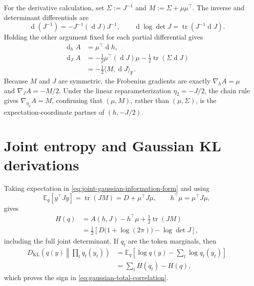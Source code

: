 For the derivative calculation, set $\Sigma:=J^{-1}$ and $M:=\Sigma+\mu\mu^\top$.  The inverse and determinant differentials are
\begin{equation}
\mathop{\mathrm d}(J^{-1})
=-J^{-1}(\mathop{\mathrm d}J)J^{-1},
\qquad
\mathop{\mathrm d}\log\det J
=\operatorname{tr}(J^{-1}\mathop{\mathrm d}J).
\label{eq:inverse-logdet-differentials}
\end{equation}
Holding the other argument fixed for each partial differential gives
\begin{equation}
\begin{aligned}
\mathop{\mathrm d}_hA
&=\mu^\top\mathop{\mathrm d}h,\\
\mathop{\mathrm d}_JA
&=-\frac12\mu^\top(\mathop{\mathrm d}J)\mu
-\frac12\operatorname{tr}(\Sigma\mathop{\mathrm d}J)\\
&=-\frac12\langle M,\mathop{\mathrm d}J\rangle_{\mathrm F}.
\end{aligned}
\label{eq:log-normalizer-differential-proof}
\end{equation}
Because $M$ and $J$ are symmetric, the Frobenius gradients are exactly $\nabla_hA=\mu$ and $\nabla_JA=-M/2$.  Under the linear reparameterization $\eta_2=-J/2$, the chain rule gives $\nabla_{\eta_2}A=M$, confirming that $(\mu,M)$, rather than $(\mu,\Sigma)$, is the expectation-coordinate partner of $(h,-J/2)$.

\section{Joint entropy and Gaussian KL derivations}

Taking expectation in \cref{eq:joint-gaussian-information-form} and using
\begin{equation}
\mathbb E_q[y^\top Jy]
=\operatorname{tr}(JM)
=D+\mu^\top J\mu,
\qquad
h^\top\mu=\mu^\top J\mu,
\label{eq:gaussian-quadratic-expectation}
\end{equation}
gives
\begin{equation}
\begin{aligned}
H(q)
&=A(h,J)-h^\top\mu
+\frac12\operatorname{tr}(JM)\\
&=\frac12
\left[D\bigl(1+\log(2\pi)\bigr)-\log\det J\right],
\end{aligned}
\label{eq:joint-entropy-derivation}
\end{equation}
including the full joint determinant.  If $q_t$ are the token marginals, then
\begin{equation}
\begin{aligned}
D_{\mathrm{KL}}
\left(q(y)\middle\Vert\prod_tq_t(y_t)\right)
&=\mathbb E_q\left[
\log q(y)-\sum_t\log q_t(y_t)
\right]\\
&=\sum_tH(q_t)-H(q),
\end{aligned}
\label{eq:total-correlation-entropy-proof}
\end{equation}
which proves the sign in \cref{eq:gaussian-total-correlation}.

